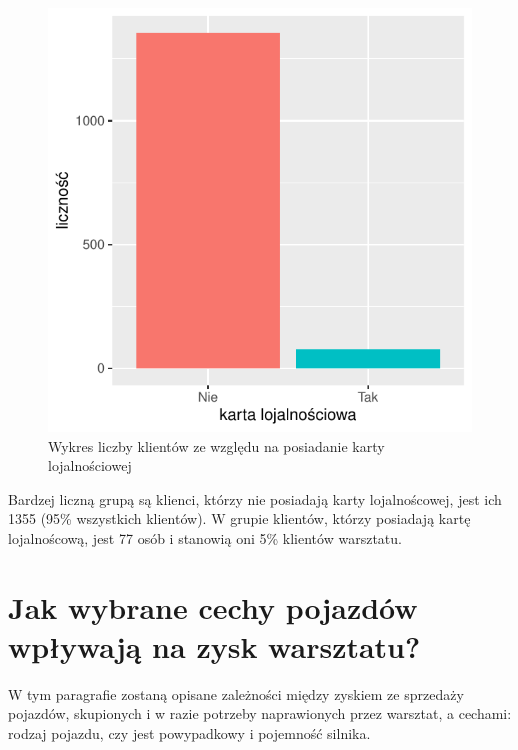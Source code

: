 \documentclass{article}\usepackage[]{graphicx}\usepackage[]{xcolor}
\makeatletter
\def\maxwidth{ %
  \ifdim\Gin@nat@width>\linewidth
    \linewidth
  \else
    \Gin@nat@width
  \fi
}
\newenvironment{knitrout}{}{} %
\makeatother
\begin{document}
\begin{knitrout}
\color{fgcolor}\begin{figure}[H]

{\centering \includegraphics[width=\maxwidth]{figure/fig_karta-1} 

}

\caption[Wykres liczby klientów ze względu na posiadanie karty lojalnościowej]{Wykres liczby klientów ze względu na posiadanie karty lojalnościowej}\label{fig:fig_karta}
\end{figure}

\end{knitrout}

Bardzej liczną grupą są klienci, którzy nie posiadają karty lojalnoścowej, jest ich 1355 (95\% wszystkich klientów). W grupie klientów, którzy posiadają kartę lojalnoścową, jest 77 osób i stanowią oni 5\% klientów warsztatu.

\section{Jak wybrane cechy pojazdów wpływają na zysk warsztatu?}

W tym paragrafie zostaną opisane zależności między zyskiem ze sprzedaży pojazdów, skupionych i w razie potrzeby naprawionych przez warsztat, a cechami: rodzaj pojazdu, czy jest powypadkowy i pojemność silnika.
\end{document}
